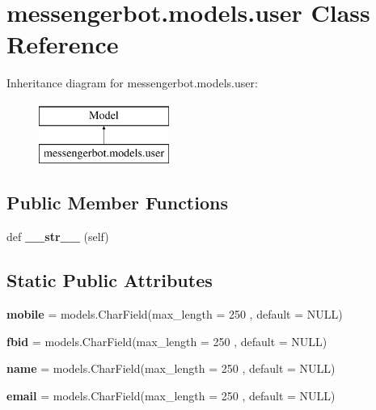\hypertarget{classmessengerbot_1_1models_1_1user}{}\section{messengerbot.\+models.\+user Class Reference}
\label{classmessengerbot_1_1models_1_1user}
Inheritance diagram for messengerbot.\+models.\+user\+:\begin{figure}[H]
\begin{center}
\leavevmode
\includegraphics[height=2.000000cm]{classmessengerbot_1_1models_1_1user}
\end{center}
\end{figure}
\subsection*{Public Member Functions}
\begin{DoxyCompactItemize}
\item 
\mbox{\label{classmessengerbot_1_1models_1_1user_a3f5e43e7673443ae3715bcb51416a735}} 
def {\bfseries \+\_\+\+\_\+str\+\_\+\+\_\+} (self)
\end{DoxyCompactItemize}
\subsection*{Static Public Attributes}
\begin{DoxyCompactItemize}
\item 
\mbox{\label{classmessengerbot_1_1models_1_1user_a006ce81d6b1219a617fb3a0d1b5c06d1}} 
{\bfseries mobile} = models.\+Char\+Field(max\+\_\+length = 250 , default = \textquotesingle{}N\+U\+LL\textquotesingle{})
\item 
\mbox{\label{classmessengerbot_1_1models_1_1user_a465b6800ae148440932d8984f6770637}} 
{\bfseries fbid} = models.\+Char\+Field(max\+\_\+length = 250 , default = \textquotesingle{}N\+U\+LL\textquotesingle{})
\item 
\mbox{\label{classmessengerbot_1_1models_1_1user_ad88b250ebdac82d889b30f31d6339754}} 
{\bfseries name} = models.\+Char\+Field(max\+\_\+length = 250 , default = \textquotesingle{}N\+U\+LL\textquotesingle{})
\item 
\mbox{\label{classmessengerbot_1_1models_1_1user_a13e9e7fd31136cc8713e0d0f98c6c9aa}} 
{\bfseries email} = models.\+Char\+Field(max\+\_\+length = 250 , default = \textquotesingle{}N\+U\+LL\textquotesingle{})
\end{DoxyCompactItemize}


